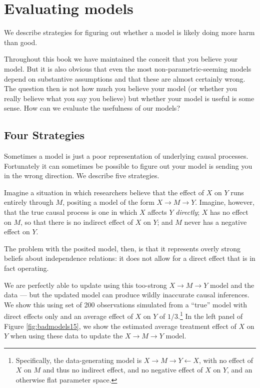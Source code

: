 \documentclass[
  12pt,
]{book}
\newenvironment{headerbox}{
  \definecolor{shadecolor}{rgb}{0.8, 0.8, 0.8}  %
  \color{black}
  \begin{shaded}}{\end{shaded}}
\begin{document}
\hypertarget{evaluation}{%
\chapter{Evaluating models}\label{evaluation}}

\begin{headerbox}
We describe strategies for figuring out whether a model is likely doing more harm than good.

\end{headerbox}

Throughout this book we have maintained the conceit that you believe your model. But it is also obvious that even the most non-parametric-seeming models depend on substantive assumptions and that these are almost certainly wrong. The question then is not how much you believe your model (or whether you really believe what you say you believe) but whether your model is useful is some sense. How can we evaluate the usefulness of our models?

\hypertarget{four-strategies}{%
\section{Four Strategies}\label{four-strategies}}

Sometimes a model is just a poor representation of underlying causal processes. Fortunately it can sometimes be possible to figure out your model is sending you in the wrong direction. We describe five strategies.

Imagine a situation in which researchers believe that the effect of \(X\) on \(Y\) runs entirely through \(M\), positing a model of the form \(X \rightarrow M \rightarrow Y\). Imagine, however, that the true causal process is one in which \(X\) affects \(Y\) \emph{directly}; \(X\) has no effect on \(M\), so that there is no indirect effect of \(X\) on \(Y\); and \(M\) never has a negative effect on \(Y\).

The problem with the posited model, then, is that it represents overly strong beliefs about independence relations: it does not allow for a direct effect that is in fact operating.

We are perfectly able to update using this too-strong \(X \rightarrow M \rightarrow Y\) model and the data --- but the updated model can produce wildly inaccurate causal inferences. We show this using set of 200 observations simulated from a ``true'' model with direct effects only and an average effect of \(X\) on \(Y\) of \(1/3\).\footnote{Specifically, the data-generating model is \(X \rightarrow M \rightarrow Y \leftarrow X\), with no effect of \(X\) on \(M\) and thus no indirect effect, and no negative effect of \(X\) on \(Y\), and an otherwise flat parameter space.} In the left panel of Figure \ref{fig:badmodels15}, we show the estimated average treatment effect of \(X\) on \(Y\) when using these data to update the \(X \rightarrow M \rightarrow Y\) model.
\end{document}
